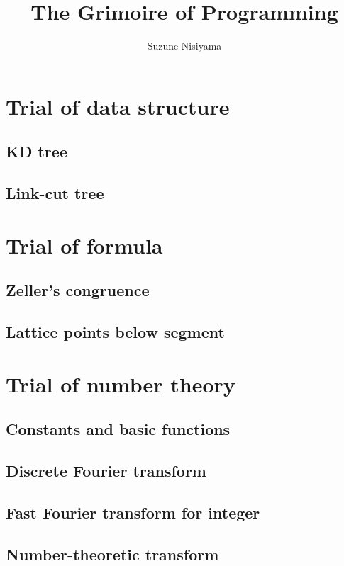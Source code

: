 \documentclass[UTF8,a4paper]{report}
\title{The Grimoire of Programming}
\date{}
\author{Suzune Nisiyama}
\begin{document}
	\tableofcontents
	\chapter{Trial of data structure}
		\section{KD tree}
			
		\section{Link-cut tree}
			
	\chapter{Trial of formula}
		\section{Zeller's congruence}
			
		\section{Lattice points below segment}
			
	\chapter{Trial of number theory}
		\section{Constants and basic functions}
			
		\section{Discrete Fourier transform}
			
		\section{Fast Fourier transform for integer}
			
		\section{Number-theoretic transform}
			
\end{document}
